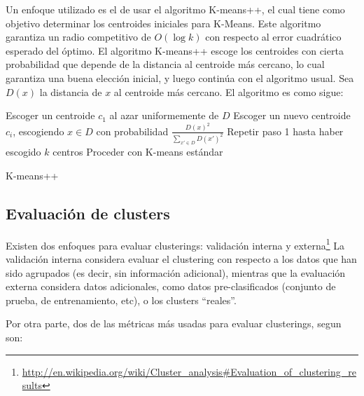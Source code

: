     Un enfoque utilizado es el de usar el algoritmo
    K-means++\cite{Arthur:2007:KAC:1283383.1283494}, el cual tiene
    como objetivo determinar los centroides iniciales para
    K-Means. Este algoritmo garantiza un radio competitivo de
    $O(\log k)$ con respecto al error cuadrático esperado del óptimo.
    El algoritmo K-means++ escoge los centroides con cierta
    probabilidad que depende de la distancia al centroide más cercano,
    lo cual garantiza una buena elección inicial, y luego continúa con
    el algoritmo usual. Sea $D(x)$ la distancia de $x$ al centroide
    más cercano. El algoritmo es como sigue:

\begin{algorithm}[H]
Escoger un centroide $c_1$ al azar uniformemente de $D$\;
Escoger un nuevo centroide $c_i$, escogiendo $x \in D$ con probabilidad $\frac{D(x)^2}{\sum_{x' \in D}D(x')^2}$\;
Repetir paso 1 hasta haber escogido $k$ centros\;
Proceder con K-means estándar\;
 \caption{K-means++}
\end{algorithm}


\subsection{Evaluación de clusters}
\label{sec-1.2.4}


    Existen dos enfoques para evaluar clusterings: validación interna
    y externa\footnote{\href{http://en.wikipedia.org/wiki/Cluster\_analysis\#Evaluation\_of\_clustering\_results}{http://en.wikipedia.org/wiki/Cluster\_analysis\#Evaluation\_of\_clustering\_results} } La validación interna considera evaluar el clustering
    con respecto a los datos que han sido agrupados (es decir, sin
    información adicional), mientras que la evaluación externa
    considera datos adicionales, como datos pre-clasificados (conjunto
    de prueba, de entrenamiento, etc), o los clusters ``reales''.

    Por otra parte, dos de las métricas más usadas para evaluar
    clusterings, segun \cite{Zhao02criterionfunctions} son:

